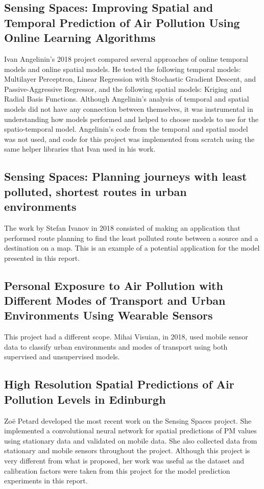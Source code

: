 \subsection {Sensing Spaces: Improving Spatial and Temporal Prediction of Air Pollution Using Online Learning Algorithms}

Ivan Angelinin's 2018 project \cite{ivan} compared several approaches of online temporal models and online spatial models. He tested the following temporal models: Multilayer Perceptron, Linear Regression with Stochastic Gradient Descent, and Passive-Aggressive Regressor, and the following spatial models: Kriging and Radial Basis Functions. Although Angelinin's analysis of temporal and spatial models did not have any connection between themselves, it was instrumental in understanding how models performed and helped to choose models to use for the spatio-temporal model. Angelinin's code from the temporal and spatial model was not used, and code for this project was implemented from scratch using the same helper libraries that Ivan used in his work.


\subsection{Sensing Spaces: Planning journeys with least polluted, shortest routes in urban environments}
The work by Stefan Ivanov in 2018 \cite{stefan} consisted of making an application that performed route planning to find the least polluted route between a source and a destination on a map. This is an example of a potential application for the model presented in this report.

\subsection{Personal Exposure to Air Pollution with Different Modes of Transport and Urban Environments Using Wearable Sensors}

This project had a different scope. Mihai Visuian, in 2018, used mobile sensor data to classify urban environments and modes of transport using both supervised and unsupervised models\cite{mihai}.

\subsection{High Resolution Spatial Predictions of Air Pollution Levels in Edinburgh}
Zoë Petard \cite{zoe} developed the most recent work on the Sensing Spaces project. She implemented a convolutional neural network for spatial predictions of PM values using stationary data and validated on mobile data. She also collected data from stationary and mobile sensors throughout the project. Although this project is very different from what is proposed, her work was useful as the dataset and calibration factors were taken from this project for the model prediction experiments in this report.
\cite{zoe}




